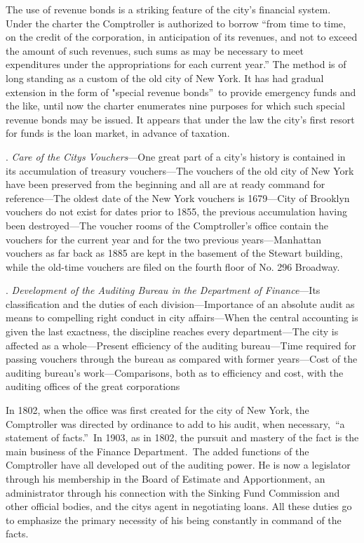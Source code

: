 \documentclass[twoside,symmetric,nobib,justified]{tufte-book}
\begin{document}
The use of revenue bonds is a striking feature of the city's financial
system. Under the charter the Comptroller is authorized to borrow ``from
time to time, on the credit of the corporation, in anticipation of its
revenues, and not to exceed the amount of such revenues, such sums as
may be necessary to meet expenditures under the appropriations for each
current year.'' The method is of long standing as a custom of the old
city of New York. It has had gradual extension in the form of "special
revenue bonds''~to provide emergency funds and the like, until now the
charter enumerates nine purposes for which such special revenue bonds
may be issued. It appears that under the law the city's first resort for
funds is the loan market, in advance of taxation.~

\vspace{.15in}

.\emph{ Care of the City\textquotesingle s Vouchers}---One great part
of a city's history is contained in its accumulation of treasury
vouchers---The vouchers of the old city of New York have been preserved
from the beginning and all are at ready command for reference---The
oldest date of the New York vouchers is 1679---City of Brooklyn vouchers
do not exist for dates prior to 1855, the previous accumulation having
been destroyed---The voucher rooms of the Comptroller's office contain
the vouchers for the current year and for the two previous
years---Manhattan vouchers as far back as 1885 are kept in the basement
of the Stewart building, while the old-time vouchers are filed on the
fourth floor of No. 296 Broadway.~~

\vspace{.15in}

.\emph{ Development of the Auditing Bureau in the Department of
Finance}---Its classification and the duties of each
division---Importance of an absolute audit as means to compelling right
conduct in city affairs---When the central accounting is given the last
exactness, the discipline reaches every department---The city is
affected as a whole---Present efficiency of the auditing bureau---Time
required for passing vouchers through the bureau as compared with former
years---Cost of the auditing bureau's work---Comparisons, both as to
efficiency and cost, with the auditing offices of the great
corporations~

In 1802, when the office was first created for the city of New York, the
Comptroller was directed by ordinance to add to his audit, when
necessary,~``a statement of facts.''~In 1903, as in 1802, the pursuit
and mastery of the fact is the main business of the Finance
Department.~The added functions of the Comptroller have all developed
out of the auditing power. He is now a legislator through his membership
in the Board of Estimate and Apportionment, an administrator through his
connection with the Sinking Fund Commission and other official bodies,
and the city\textquotesingle s agent in negotiating loans. All these
duties go to emphasize the primary necessity of his being constantly in
command of the facts.~
\end{document}
